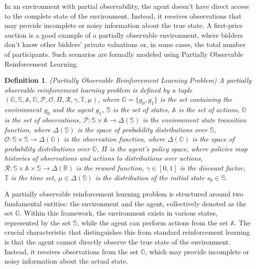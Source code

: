 \documentclass[12pt]{article}
\newtheorem{definition}[theorem]{Definition}
\begin{document}
In an environment with partial observability, the agent doesn't have direct access to the complete state of the environment. Instead, it receives observations that may provide incomplete or noisy information about the true state. A first-price auction is a good example of a partially observable environment, where bidders don't know other bidders' private valuations or, in some cases, the total number of participants. Such scenarios are formally modeled using Partially Observable Reinforcement Learning.

\begin{definition} (Partially Observable Reinforcement Learning Problem) A partially observable reinforcement learning problem is defined by a tuple $\left(\mathbb{G},\mathbb{S},\mathbb{A},\mathbb{O},\mathcal{P},\mathcal{O},\Pi,\mathcal{R},\gamma,\mathbb{T},\mu \right)$, where $\mathbb{G} = \{g_{0},g_{1}\}$ is the set containing the environment $g_{0}$ and the agent $g_{1}$, $\mathbb{S}$ is the set of states, $\mathbb{A}$ is the set of actions, $\mathbb{O}$ is the set of observations, $\mathcal{P}: \mathbb{S} \times \mathbb{A} \to \Delta(\mathbb{S})$ is the environment state transition function, where $\Delta (\mathbb{S})$ is the space of probability distributions over $\mathbb{S}$, $\mathcal{O}: \mathbb{S} \times \mathbb{S} \to \Delta(\mathbb{O})$ is the observation function, where $\Delta (\mathbb{O})$ is the space of probability distributions over $\mathbb{O}$, $\Pi$ is the agent's policy space, where policies map histories of observations and actions to distributions over actions, $\mathcal{R}: \mathbb{S} \times \mathbb{A} \times \mathbb{S} \to \Delta (\mathbb{R})$ is the reward function, $\gamma \in [0,1]$ is the discount factor, $\mathbb{T}$ is the time set, $\mu \in \Delta (\mathbb{S})$ is the distribution of the initial state $s_{0} \in \mathbb{S}$.
\end{definition}

A partially observable reinforcement learning problem is structured around two fundamental entities: the environment and the agent, collectively denoted as the set $\mathbb{G}$. Within this framework, the environment exists in various states, represented by the set $\mathbb{S}$, while the agent can perform actions from the set $\mathbb{A}$. The crucial characteristic that distinguishes this from standard reinforcement learning is that the agent cannot directly observe the true state of the environment. Instead, it receives observations from the set $\mathbb{O}$, which may provide incomplete or noisy information about the actual state.

\printbibliography
\end{document}
